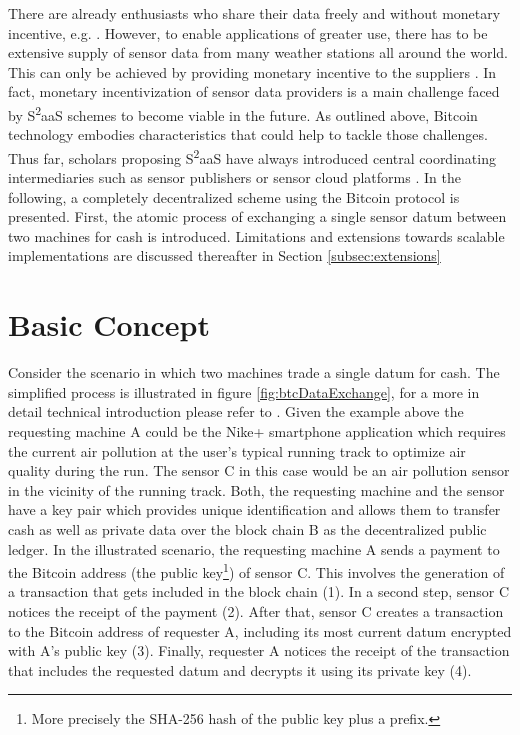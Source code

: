 There are already enthusiasts who share their data freely and without monetary incentive, e.g. \parencite{wunderground.com}. However, to enable applications of greater use, there has to be extensive supply of sensor data from many weather stations all around the world. This can only be achieved by providing monetary incentive to the suppliers \parencite{bohli2009initial}. In fact, monetary incentivization of sensor data providers is a main challenge faced by S\textsuperscript{2}aaS schemes to become viable in the future. As outlined above, Bitcoin technology embodies characteristics that could help to tackle those challenges. Thus far, scholars proposing S\textsuperscript{2}aaS have always introduced central coordinating intermediaries \parencite{bohli2009initial} such as sensor publishers \parencite{perera2014sensing} or sensor cloud platforms \parencite{sheng2013sensing}. 
In the following, a completely decentralized scheme using the Bitcoin protocol is presented. First, the atomic process of exchanging a single sensor datum between two machines for cash is introduced. Limitations and extensions towards scalable implementations are discussed thereafter in Section \ref{subsec:extensions}

\section{Basic Concept}

Consider the scenario in which two machines trade a single datum for cash. The simplified process is illustrated in figure \ref{fig:btcDataExchange}, for a more in detail technical introduction please refer to \parencite{bitcoinwiki, nakamoto2008bitcoin}. Given the example above the requesting machine A could be the Nike+ smartphone application which requires the current air pollution at the user's typical running track to optimize air quality during the run. The sensor C in this case would be an air pollution sensor in the vicinity of the running track. Both, the requesting machine and the sensor have a key pair which provides unique identification and allows them to transfer cash as well as private data over the block chain B as the decentralized public ledger. 
In the illustrated scenario, the requesting machine A sends a payment to the Bitcoin address (the public key\footnote{More precisely the SHA-256 hash of the public key plus a prefix.}) of sensor C. This involves the generation of a transaction that gets included in the block chain (1). In a second step, sensor C notices the receipt of the payment (2). After that, sensor C creates a transaction to the Bitcoin address of requester A, including its most current datum encrypted with A's public key  (3). Finally, requester A notices the receipt of the transaction that includes the requested datum and decrypts it using its private key (4).

